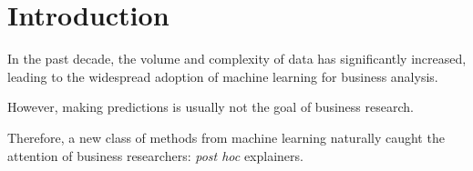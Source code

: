 \documentclass[mnsc,blindrev]{informs3}
\begin{document}

 

\maketitle

\section{Introduction}




In the past decade, the volume and complexity of data has significantly increased, leading to the widespread adoption of machine learning for business analysis. 


However, making predictions is usually not the goal of business research. 


Therefore, a new class of methods from machine learning naturally caught the attention of business researchers: \emph{post hoc} explainers. 
\end{document}
